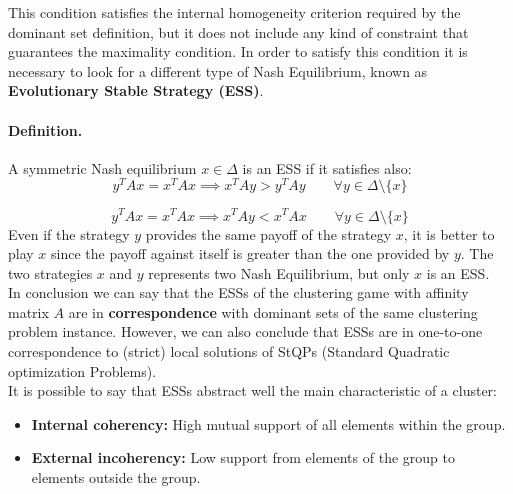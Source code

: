 This condition satisfies the internal homogeneity criterion required by the dominant set definition, but it does not include any kind of constraint that guarantees the maximality condition. In order to satisfy this condition it is necessary to look for a different type of Nash Equilibrium, known as \textbf{Evolutionary Stable Strategy (ESS)}. 

\paragraph{Definition.} A symmetric Nash equilibrium $x\in \Delta$ is an ESS if it satisfies also:
$$y^TAx = x^TAx \implies x^TAy > y^TAy \qquad \forall y \in \Delta\setminus\{x\}$$

$$y^TAx = x^TAx \implies x^TAy < x^TAx \qquad \forall y \in \Delta\setminus\{x\}$$
Even if the strategy $y$ provides the same payoff of the strategy $x$, it is better to play $x$ since the payoff against itself is greater than the one provided by $y$. The two strategies $x$ and $y$ represents two Nash Equilibrium, but only $x$ is an ESS.\\
In conclusion we can say that the ESSs of the clustering game with affinity matrix $A$ are in \textbf{correspondence} with dominant sets of the same clustering problem instance. However, we can also conclude that ESSs are in one-to-one correspondence to (strict) local solutions of StQPs (Standard Quadratic optimization Problems).\\
It is possible to say that ESSs abstract well the main characteristic of a cluster:
\begin{itemize}
	\item \textbf{Internal coherency:} High mutual support of all elements within the group.
	\item \textbf{External incoherency:} Low support from elements of the group to elements outside the group.
\end{itemize}


